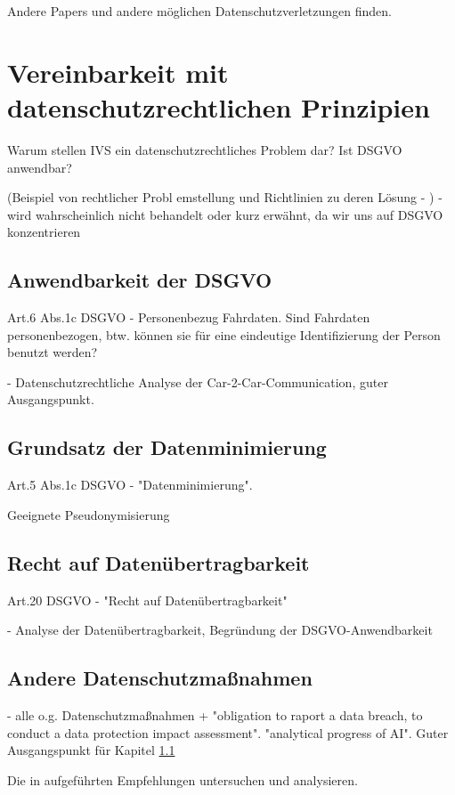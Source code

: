 Andere Papers und andere möglichen Datenschutzverletzungen finden. 

\section{Vereinbarkeit mit datenschutzrechtlichen Prinzipien}
\label{ch:SecondContentSection}

Warum stellen IVS ein datenschutzrechtliches Problem dar? Ist DSGVO anwendbar? 

(Beispiel von rechtlicher Probl	emstellung und Richtlinien zu deren Lösung - \cite{EUCooperativeV2X} ) - wird wahrscheinlich nicht behandelt oder kurz erwähnt, da wir uns auf DSGVO konzentrieren

\subsection{Anwendbarkeit der DSGVO}
\label{sec:SecondContentSection:SecondSubsection}

Art.6 Abs.1c DSGVO - Personenbezug Fahrdaten. Sind Fahrdaten personenbezogen, btw. können sie für eine eindeutige Identifizierung der Person benutzt werden?

\cite{Weichert2016} - Datenschutzrechtliche Analyse der Car-2-Car-Communication, guter Ausgangspunkt.

\subsection{Grundsatz der Datenminimierung}

Art.5 Abs.1c DSGVO - "Datenminimierung". 

Geeignete Pseudonymisierung

\subsection{Recht auf Datenübertragbarkeit}

Art.20 DSGVO - "Recht auf Datenübertragbarkeit"

\cite{Straub2018} - Analyse der Datenübertragbarkeit, Begründung der DSGVO-Anwendbarkeit

\subsection{Andere Datenschutzmaßnahmen}

\cite{Seewald2018} - alle o.g. Datenschutzmaßnahmen + "obligation to raport a data breach, to conduct a data protection impact assessment". "analytical progress of AI". Guter Ausgangspunkt für Kapitel \ref{sec:SecondContentSection:SecondSubsection}

Die in \cite{Kiometzis2017} aufgeführten Empfehlungen untersuchen und analysieren. 

